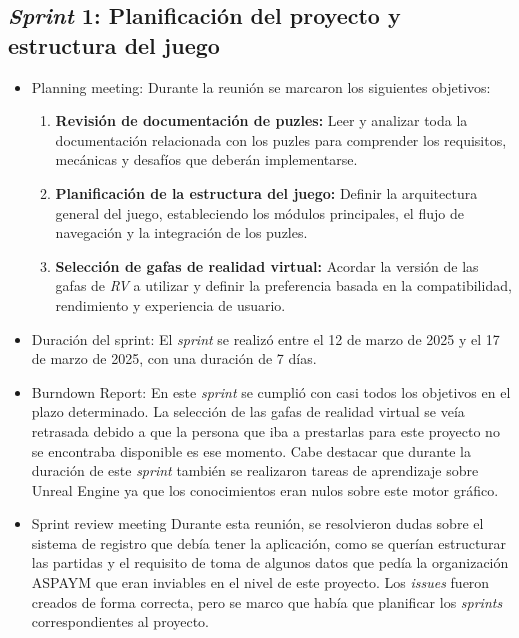 \subsection{\textbf{\textit{Sprint} 1: Planificación del proyecto y estructura del juego}}
\begin{itemize}
\item {Planning meeting}:
Durante la reunión se marcaron los siguientes objetivos:

\begin{enumerate}
\item \textbf{Revisión de documentación de puzles:}
  Leer y analizar toda la documentación relacionada con los puzles para comprender los requisitos,  
  mecánicas y desafíos que deberán implementarse.

\item \textbf{Planificación de la estructura del juego:}
  Definir la arquitectura general del juego, estableciendo los módulos  
  principales, el flujo de navegación y la integración de los puzles.

\item \textbf{Selección de gafas de realidad virtual:}
  Acordar la versión de las gafas de \textit{RV} a utilizar y definir la  
  preferencia basada en la compatibilidad, rendimiento y experiencia de usuario.
\end{enumerate}

    \item {Duración del sprint:}
El \textit{sprint} se realizó entre el 12 de marzo de 2025 y el 17 de marzo de 2025, con una duración de 7 días.

    \item {Burndown Report:}
En este \textit{sprint} se cumplió con casi todos los objetivos en el plazo determinado. La selección de las gafas de realidad virtual se veía retrasada debido a que la persona que iba a prestarlas para este proyecto no se encontraba disponible es ese momento. Cabe destacar que durante la duración de este \textit{sprint} también se realizaron tareas de aprendizaje sobre Unreal Engine ya que los conocimientos eran nulos sobre este motor gráfico. 

    \item {Sprint review meeting}
Durante esta reunión, se resolvieron  dudas sobre el sistema de registro que debía tener la aplicación, como se querían estructurar las partidas y el requisito de toma de algunos datos que pedía la organización ASPAYM que eran inviables en el nivel de este proyecto. Los \textit{issues} fueron creados de forma correcta, pero se marco que había que planificar los \textit{sprints} correspondientes al proyecto.
\end{itemize}
